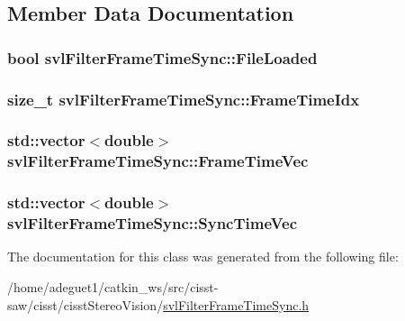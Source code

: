\subsection{Member Data Documentation}
\hypertarget{classsvl_filter_frame_time_sync_a59978f199103c4f72dd7622029cd290a}{
\subsubsection[{File\-Loaded}]{\setlength{\rightskip}{0pt plus 5cm}bool svl\-Filter\-Frame\-Time\-Sync\-::\-File\-Loaded\hspace{0.3cm}{\ttfamily [protected]}}}\label{classsvl_filter_frame_time_sync_a59978f199103c4f72dd7622029cd290a}
\hypertarget{classsvl_filter_frame_time_sync_a514b0c86986cec46d63d12ca68854842}{
\subsubsection[{Frame\-Time\-Idx}]{\setlength{\rightskip}{0pt plus 5cm}size\-\_\-t svl\-Filter\-Frame\-Time\-Sync\-::\-Frame\-Time\-Idx\hspace{0.3cm}{\ttfamily [protected]}}}\label{classsvl_filter_frame_time_sync_a514b0c86986cec46d63d12ca68854842}
\hypertarget{classsvl_filter_frame_time_sync_a7bf99c445800fe0e23a70eba6bd93f3d}{
\subsubsection[{Frame\-Time\-Vec}]{\setlength{\rightskip}{0pt plus 5cm}std\-::vector$<$double$>$ svl\-Filter\-Frame\-Time\-Sync\-::\-Frame\-Time\-Vec\hspace{0.3cm}{\ttfamily [protected]}}}\label{classsvl_filter_frame_time_sync_a7bf99c445800fe0e23a70eba6bd93f3d}
\hypertarget{classsvl_filter_frame_time_sync_a4d5d8201aa1a99de2559bc304ad54678}{
\subsubsection[{Sync\-Time\-Vec}]{\setlength{\rightskip}{0pt plus 5cm}std\-::vector$<$double$>$ svl\-Filter\-Frame\-Time\-Sync\-::\-Sync\-Time\-Vec\hspace{0.3cm}{\ttfamily [protected]}}}\label{classsvl_filter_frame_time_sync_a4d5d8201aa1a99de2559bc304ad54678}


The documentation for this class was generated from the following file\-:\begin{DoxyCompactItemize}
\item 
/home/adeguet1/catkin\-\_\-ws/src/cisst-\/saw/cisst/cisst\-Stereo\-Vision/\hyperlink{svl_filter_frame_time_sync_8h}{svl\-Filter\-Frame\-Time\-Sync.\-h}\end{DoxyCompactItemize}
